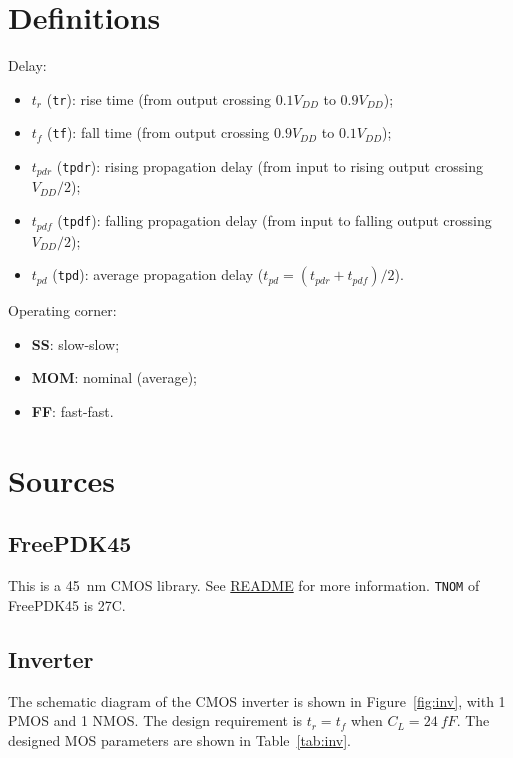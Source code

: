 \documentclass{scrartcl}
\begin{document}
  \section{Definitions}
    Delay:
    \begin{itemize}
      \item $t_r$ (\texttt{tr}): rise time (from output crossing $0.1V_{DD}$ to $0.9V_{DD}$);
      \item $t_f$ (\texttt{tf}): fall time (from output crossing $0.9V_{DD}$ to $0.1V_{DD}$);
      \item $t_{pdr}$ (\texttt{tpdr}): rising propagation delay (from input to rising output crossing $V_{DD}/2$);
      \item $t_{pdf}$ (\texttt{tpdf}): falling propagation delay (from input to falling output crossing $V_{DD}/2$);
      \item $t_{pd}$ (\texttt{tpd}): average propagation delay ($t_{pd} = (t_{pdr} + t_{pdf})/2$).
    \end{itemize}

    Operating corner:
    \begin{itemize}
      \item \textbf{SS}: slow-slow;
      \item \textbf{MOM}: nominal (average);
      \item \textbf{FF}: fast-fast.
    \end{itemize}
    

  \section{Sources}

    \subsection{FreePDK45}

      This is a \qty{45}{nm} CMOS library.
      See \href{https://github.com/Teddy-van-Jerry/ngspice-cmos/blob/master/FreePDK45/README}{README} for more information.
      \texttt{TNOM} of FreePDK45 is 27C.

    \subsection{Inverter}\label{s:inv}

      The schematic diagram of the CMOS inverter is shown in Figure~\ref{fig:inv},
      with 1 PMOS and 1 NMOS.
      The design requirement is $t_r=t_f$ when $C_L=\qty{24}{fF}$.
      The designed MOS parameters are shown in Table~\ref{tab:inv}.
\end{document}
